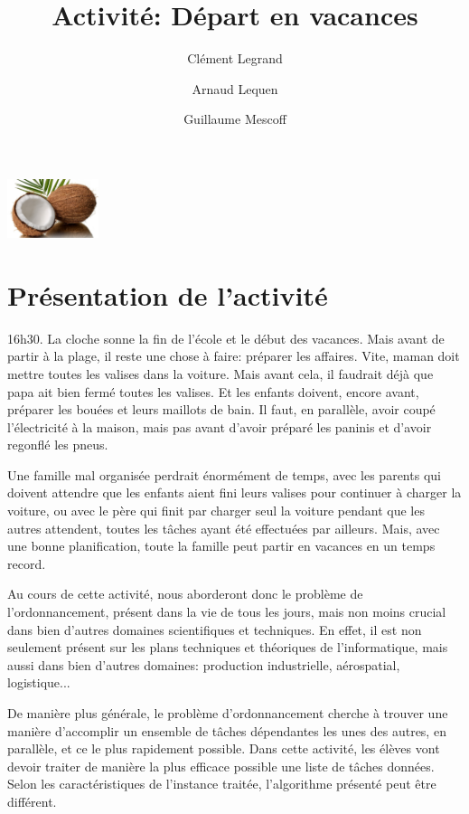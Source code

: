 \documentclass{article}
\title{Activité: Départ en vacances} %
\author{Clément Legrand \and Arnaud Lequen \and Guillaume Mescoff}
\begin{document}
\maketitle
\begin{center}
  \includegraphics[width=0.2\textwidth]{assets/coco.png}  
\end{center}




\section{Présentation de l'activité}

16h30. La cloche sonne la fin de l'école et le début des vacances. Mais avant de partir à la plage, il reste une chose à faire: préparer les affaires. Vite, maman doit mettre toutes les valises dans la voiture. Mais avant cela, il faudrait déjà que papa ait bien fermé toutes les valises. Et les enfants doivent, encore avant, préparer les bouées et leurs maillots de bain. Il faut, en parallèle, avoir coupé l'électricité à la maison, mais pas avant d'avoir préparé les paninis et d'avoir regonflé les pneus.

Une famille mal organisée perdrait énormément de temps, avec les parents qui doivent attendre que les enfants aient fini leurs valises pour continuer à charger la voiture, ou avec le père qui finit par charger seul la voiture pendant que les autres attendent, toutes les tâches ayant été effectuées par ailleurs. Mais, avec une bonne planification, toute la famille peut partir en vacances en un temps record.

Au cours de cette activité, nous aborderont donc le problème de l'ordonnancement, présent dans la vie de tous les jours, mais non moins crucial dans bien d'autres domaines scientifiques et techniques. En effet, il est non seulement présent sur les plans techniques et théoriques de l'informatique, mais aussi dans bien d'autres domaines: production industrielle, aérospatial, logistique...

De manière plus générale, le problème d'ordonnancement cherche à trouver une manière d'accomplir un ensemble de tâches dépendantes les unes des autres, en parallèle, et ce le plus rapidement possible. Dans cette activité, les élèves vont devoir traiter de manière la plus efficace possible une liste de tâches données. Selon les caractéristiques de l'instance traitée, l'algorithme présenté peut être différent.
\end{document}
